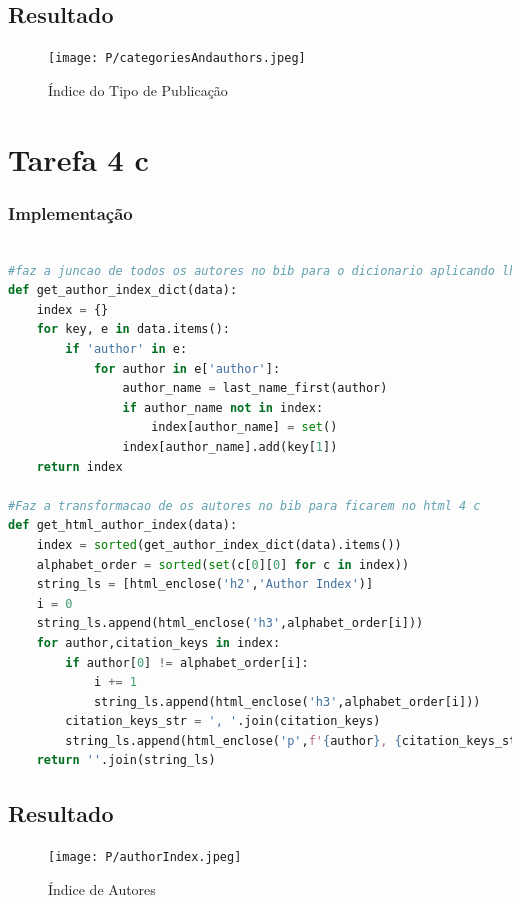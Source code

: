 \documentclass[11pt,a4paper]{report}
\begin{document}
\subsection{Resultado}

\begin{figure}[h]
\centering
\texttt{[image: P/categoriesAndauthors.jpeg]}
\caption{Índice do Tipo de Publicação}
\end{figure}

\section{Tarefa 4 c}

\subsubsection{Implementação}
\begin{lstlisting}[language=python]

#faz a juncao de todos os autores no bib para o dicionario aplicando lhe um primeiro filtro
def get_author_index_dict(data):
    index = {}
    for key, e in data.items():
        if 'author' in e:
            for author in e['author']:
                author_name = last_name_first(author)
                if author_name not in index:
                    index[author_name] = set()
                index[author_name].add(key[1])
    return index

#Faz a transformacao de os autores no bib para ficarem no html 4 c
def get_html_author_index(data):
    index = sorted(get_author_index_dict(data).items())
    alphabet_order = sorted(set(c[0][0] for c in index))
    string_ls = [html_enclose('h2','Author Index')]
    i = 0
    string_ls.append(html_enclose('h3',alphabet_order[i]))
    for author,citation_keys in index:
        if author[0] != alphabet_order[i]:
            i += 1
            string_ls.append(html_enclose('h3',alphabet_order[i]))
        citation_keys_str = ', '.join(citation_keys)
        string_ls.append(html_enclose('p',f'{author}, {citation_keys_str}'))
    return ''.join(string_ls)
\end{lstlisting}

\subsection{Resultado}
\begin{figure}[h]
\centering
\texttt{[image: P/authorIndex.jpeg]}
\caption{Índice de Autores}
\end{figure}
\end{document}
